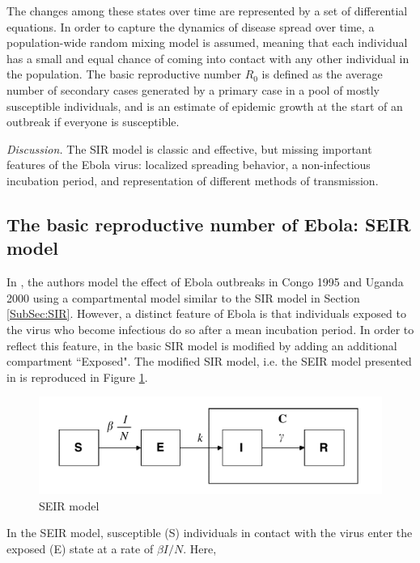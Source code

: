 \documentclass[10pt, journal,onecolumn]{IEEEtran}
\begin{document}
The changes among these states over time are represented by a set of differential equations. In
order to capture the dynamics of disease spread over time, a population-wide random mixing model is
assumed, meaning that each individual has a small and equal chance of coming into contact with
any other individual in the population. The basic reproductive number $R_0$
is defined as the average number of secondary cases generated by a primary case in a pool of mostly
susceptible individuals, and is an estimate of epidemic growth at the start of an outbreak if
everyone is susceptible.

\textit{Discussion.} The SIR model is classic and effective, but missing important features
of the Ebola virus: localized spreading behavior, a non-infectious incubation period, and
representation of different methods of transmission.

\subsection{\textbf{The basic reproductive number of Ebola: SEIR model \citep{chowell2004basic}}}

In \citep{chowell2004basic}, the authors model the effect of Ebola outbreaks in Congo 1995 and Uganda
2000 using a compartmental model similar to the SIR model in Section \ref{SubSec:SIR}. However, a
distinct feature of Ebola is that individuals exposed to the virus who become infectious do so
after a mean incubation period. In order to reflect this feature, in \citep{chowell2004basic} the
basic SIR model is modified by adding an additional compartment ``Exposed". The modified SIR model,
i.e. the SEIR model presented in \citep{chowell2004basic} is reproduced in
Figure \ref{fig:SEIR_model}.

\begin{figure}[h!]
\captionsetup{justification=centering}
\includegraphics[scale=0.5]{seir_model_fig}
\centering\caption{SEIR model}
\label{fig:SEIR_model}
\end{figure}

In the SEIR model, susceptible (S) individuals in contact with the virus enter the exposed (E) state at a rate of $\beta I / N$. Here,
\end{document}
